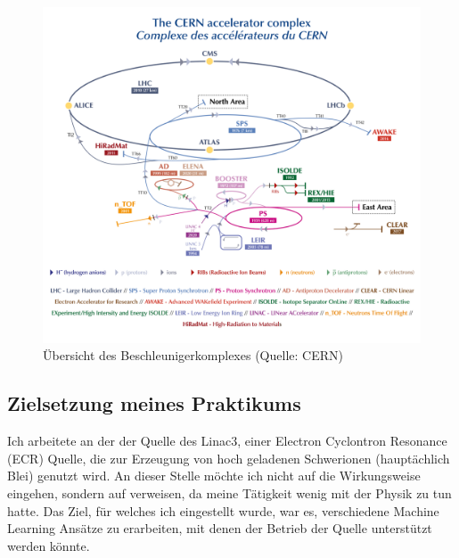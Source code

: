 \documentclass[11pt, a4paper, titlepage, headings=standardclasses]{scrartcl}
\begin{document}
\begin{figure}
    \centering
    \includegraphics{cern_acc_complex.png}
    \caption{Übersicht des Beschleunigerkomplexes (Quelle: CERN)}
    \label{fig:cern_acc_complex}
\end{figure}

\subsection*{Zielsetzung meines Praktikums}

Ich arbeitete an der der Quelle des Linac3, einer Electron Cyclontron Resonance (ECR) Quelle, die zur Erzeugung von hoch geladenen Schwerionen (hauptächlich Blei) genutzt wird. An dieser Stelle möchte ich nicht auf die Wirkungsweise eingehen, sondern auf \cite{ECRsource} verweisen, da meine Tätigkeit wenig mit der Physik zu tun hatte. Das Ziel, für welches ich eingestellt wurde, war es, verschiedene Machine Learning Ansätze zu erarbeiten, mit denen der Betrieb der Quelle unterstützt werden könnte.
\end{document}
